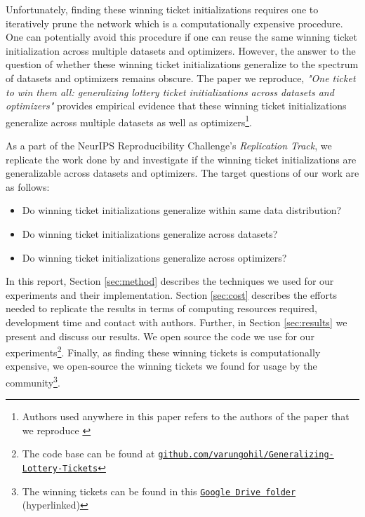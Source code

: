     Unfortunately, finding these winning ticket initializations requires one to iteratively prune the network which is a computationally expensive procedure. One can potentially avoid this procedure if one can reuse the same winning ticket initialization across multiple datasets and optimizers. However, the answer to the question of whether these winning ticket initializations generalize to the spectrum of datasets and optimizers remains obscure. The paper we reproduce,  \textit{"One ticket to win them all: generalizing lottery ticket initializations across datasets and optimizers"} \cite{repro_paper} provides empirical evidence that these winning ticket initializations generalize across multiple datasets as well as optimizers\footnote{Authors used anywhere in this paper refers to the authors of the paper that we reproduce \cite{repro_paper}}.
     
     
    As a part of the NeurIPS Reproducibility Challenge's \textit{Replication Track}, we replicate the work done by \cite{repro_paper} and investigate if the winning ticket initializations are generalizable across datasets and optimizers. The target questions of our work are as follows:
    \begin{itemize}
        \item Do winning ticket initializations generalize within same data distribution?
        \item Do winning ticket initializations generalize across datasets?
        \item Do winning ticket initializations generalize across optimizers?
    \end{itemize}
    
    In this report, Section \ref{sec:method} describes the techniques we used for our experiments and their implementation.  Section \ref{sec:cost} describes the efforts needed to replicate the results in terms of computing resources required, development time and contact with authors. Further, in Section \ref{sec:results} we present and discuss our results. We open source the code we use for our experiments\footnote{The code base can be found at \href{https://github.com/varungohil/Generalizing-Lottery-Tickets}{\texttt{github.com/varungohil/Generalizing-Lottery-Tickets}}}. Finally, as finding these winning tickets is computationally expensive, we open-source the winning tickets we found for usage by the community\footnote{The winning tickets can be found in this  \href{https://drive.google.com/drive/folders/1Nd-J4EwmgWbUARYaqe9iCF6efEFf9S2P?usp=sharing}{\texttt{Google Drive folder}} (hyperlinked)}. 
    
